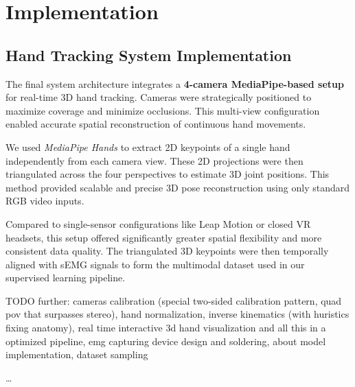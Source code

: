 \chapter{Implementation}
\label{chap:impl}

\section{Hand Tracking System Implementation}

The final system architecture integrates a \textbf{4-camera MediaPipe-based setup} for real-time 3D hand tracking. Cameras were strategically positioned to maximize coverage and minimize occlusions. This multi-view configuration enabled accurate spatial reconstruction of continuous hand movements.

We used \textit{MediaPipe Hands} to extract 2D keypoints of a single hand independently from each camera view. These 2D projections were then triangulated across the four perspectives to estimate 3D joint positions. This method provided scalable and precise 3D pose reconstruction using only standard RGB video inputs.

Compared to single-sensor configurations like Leap Motion or closed VR headsets, this setup offered significantly greater spatial flexibility and more consistent data quality. The triangulated 3D keypoints were then temporally aligned with sEMG signals to form the multimodal dataset used in our supervised learning pipeline.

TODO
further: cameras calibration (special two-sided calibration pattern, quad pov that surpasses stereo), hand normalization, inverse kinematics (with huristics fixing anatomy), real time interactive 3d hand visualization and all this in a optimized pipeline, emg capturing device design and soldering, about model implementation, dataset sampling 

\ldots